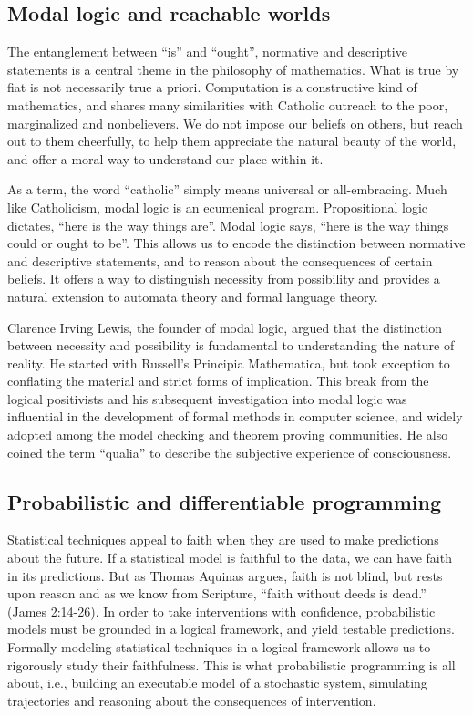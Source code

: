 \documentclass[sigplan,nonacm]{acmart}\settopmatter{printfolios=false,printccs=false,printacmref=false}
\begin{document}
\subsection{Modal logic and reachable worlds}

The entanglement between ``is'' and ``ought'', normative and descriptive statements is a central theme in the philosophy of mathematics. What is true by fiat is not necessarily true a priori. Computation is a constructive kind of mathematics, and shares many similarities with Catholic outreach to the poor, marginalized and nonbelievers. We do not impose our beliefs on others, but reach out to them cheerfully, to help them appreciate the natural beauty of the world, and offer a moral way to understand our place within it.

As a term, the word ``catholic'' simply means universal or all-embracing. Much like Catholicism, modal logic is an ecumenical program. Propositional logic dictates, ``here is the way things are''. Modal logic says, ``here is the way things could or ought to be''. This allows us to encode the distinction between normative and descriptive statements, and to reason about the consequences of certain beliefs. It offers a way to distinguish necessity from possibility and provides a natural extension to automata theory and formal language theory.

Clarence Irving Lewis, the founder of modal logic, argued that the distinction between necessity and possibility is fundamental to understanding the nature of reality. He started with Russell's Principia Mathematica, but took exception to conflating the material and strict forms of implication. This break from the logical positivists and his subsequent investigation into modal logic was influential in the development of formal methods in computer science, and widely adopted among the model checking and theorem proving communities. He also coined the term ``qualia'' to describe the subjective experience of consciousness.

\subsection{Probabilistic and differentiable programming}

Statistical techniques appeal to faith when they are used to make predictions about the future. If a statistical model is faithful to the data, we can have faith in its predictions. But as Thomas Aquinas argues, faith is not blind, but rests upon reason and as we know from Scripture, ``faith without deeds is dead.'' (James 2:14-26). In order to take interventions with confidence, probabilistic models must be grounded in a logical framework, and yield testable predictions. Formally modeling statistical techniques in a logical framework allows us to rigorously study their faithfulness. This is what probabilistic programming is all about, i.e., building an executable model of a stochastic system, simulating trajectories and reasoning about the consequences of intervention.
\end{document}
